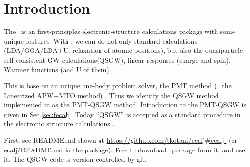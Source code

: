 %
\newpage
\section{Introduction}
The \ecalj\ is an first-principles electronic-structure 
calculations package with some unique features.
With \ecalj, we can do not only standard calculations
(LDA/GGA/LDA+U, relaxation of atomic positions), but also 
the quasiparticle self-consistent GW calculations(QSGW),
linear responses (charge and spin), Wannier functions (and U of them).

This is base on an unique one-body problem solver, the PMT method 
(=the Linearized APW+MTO method) \cite{kotani2015pmt}.
Thus we identify the QSGW method implemented in \ecalj as the PMT-QSGW method.
Introduction to the PMT-QSGW is given in Sec.\ref{sec:fecalj}. 
Today ``QSGW'' is accepted as a standard procedure in the electronic
structure calculations \cite{di_valentin_quasiparticle_2014}.




First, see README.md shown at 
\url{https://github.com/tkotani/ecalj#ecalj-} 
(or ecalj/README.md in the package).
Free to download \ecalj\ package from it, and use it.
The QSGW code is version controlled by git. 


